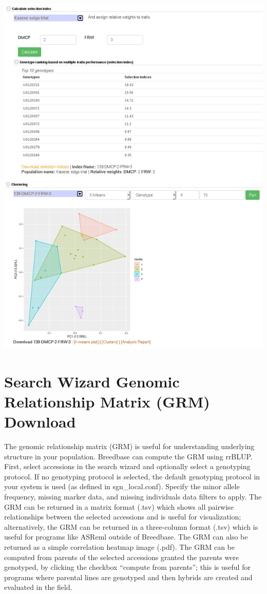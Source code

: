\documentclass[
  12pt,
]{book}
\begin{document}
\begin{center}\includegraphics[width=0.95\linewidth]{assets/images/selection_proportion_clustering} \end{center}

\hypertarget{search-wizard-genomic-relationship-matrix-grm-download}{%
\section{Search Wizard Genomic Relationship Matrix (GRM) Download}\label{search-wizard-genomic-relationship-matrix-grm-download}}

The genomic relationship matrix (GRM) is useful for understanding underlying structure in your population. Breedbase can compute the GRM using rrBLUP. First, select accessions in the search wizard and optionally select a genotyping protocol. If no genotyping protocol is selected, the default genotyping protocol in your system is used (as defined in sgn\_local.conf). Specify the minor allele frequency, missing marker data, and missing individuals data filters to apply. The GRM can be returned in a matrix format (.tsv) which shows all pairwise relationships between the selected accessions and is useful for visualization; alternatively, the GRM can be returned in a three-column format (.tsv) which is useful for programs like ASReml outside of Breedbase. The GRM can also be returned as a simple correlation heatmap image (.pdf). The GRM can be computed from parents of the selected accessions granted the parents were genotyped, by clicking the checkbox ``compute from parents''; this is useful for programs where parental lines are genotyped and then hybrids are created and evaluated in the field.
\end{document}
